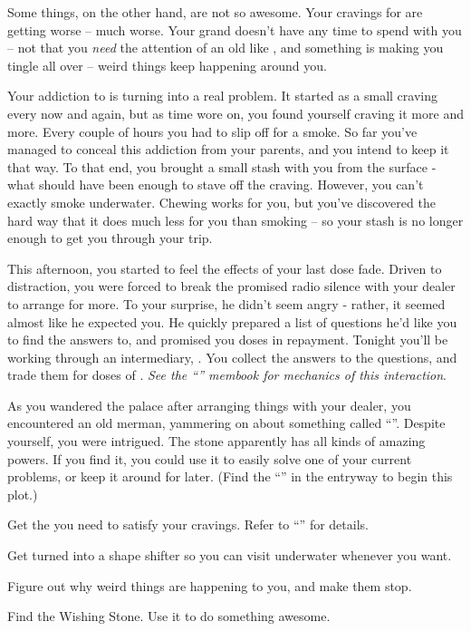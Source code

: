 \documentclass[char]{NeptuneBall}
\begin{document}
Some things, on the other hand, are not so awesome. Your cravings for \iDrug{\MYname} are getting worse -- much worse. Your grand\cKing{\parent} doesn't have any time to spend with you -- not that you \emph{need} the attention of an old \cKing{\mer} like \cKing{\them}, and something is making you tingle all over -- weird things keep happening around you. 

Your addiction to \iDrug{} is turning into a real problem. It started as a small craving every now and again, but as time wore on, you found yourself craving it more and more. Every couple of hours you had to slip off for a smoke. So far you've managed to conceal this addiction from your parents, and you intend to keep it that way. To that end, you brought a small stash with you from the surface - what should have been enough to stave off the craving. However, you can't exactly smoke underwater.  Chewing \iDrug{} works for you, but you've discovered the hard way that it does much less for you than smoking -- so your stash is no longer enough to get you through your trip.

This afternoon, you started to feel the effects of your last dose fade. Driven to distraction, you were forced to break the promised radio silence with your dealer to arrange for more. To your surprise, he didn't seem angry - rather, it seemed almost like he expected you. He quickly prepared a list of questions he'd like you to find the answers to, and promised you doses in repayment. Tonight you'll be working through an intermediary, \cReporter{}. You collect the answers to the questions, and trade them for doses of \iDrug{}. \emph{See the ``\mSpyBook{}'' membook for mechanics of this interaction}.

As you wandered the palace after arranging things with your dealer, you encountered an old merman, yammering on about something called ``\iWishingStone{\MYname}''. Despite yourself, you were intrigued. The stone apparently has all kinds of amazing powers. If you find it, you could use it to easily solve one of your current problems, or keep it around for later. (Find the ``\sOldMan{}'' in the entryway to begin this plot.)

\begin{itemz}[Goals]
  \item Get the \iDrug{} you need to satisfy your cravings. Refer to ``\gAddicted{}'' for details.
  \item Get turned into a shape shifter so you can visit underwater whenever you want.
	\item Figure out why weird things are happening to you, and make them stop.
	\item Find the Wishing Stone. Use it to do something awesome.
\end{itemz}
\end{document}
